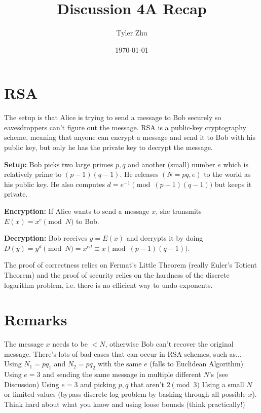\documentclass[11 pt]{scrartcl}
\newcommand{\hwtitle}{Discussion 4A Recap}
\begin{document}
 
\title{\Large \hwtitle{}}
\author{\large Tyler Zhu}
\date{\large\today}

\maketitle 

\section{RSA}
The setup is that Alice is trying to send a message to Bob securely so eavesdroppers can't figure out the message. RSA is a public-key cryptography scheme, meaning that anyone can encrypt a message and send it to Bob with his public key, but only he has the private key to decrypt the message.

\textbf{Setup:} Bob picks two large primes $p,q$ and another (small) number $e$ which is relatively prime to $(p-1)(q-1)$. He releases $(N=pq, e)$ to the world as his public key. He also computes $d = e^{-1} \pmod{(p-1)(q-1)}$ but keeps it private.

\textbf{Encryption:} If Alice wants to send a message $x$, she transmits $E(x) = x^e \pmod{N}$ to Bob.

\textbf{Decryption:} Bob receives $y = E(x)$ and decrypts it by doing $D(y) = y^d \pmod{N} = x^{ed} \equiv x \pmod{(p-1)(q-1)}$.  

The proof of correctness relies on Fermat's Little Theorem (really Euler's Totient Theorem) and the proof of security relies on the hardness of the discrete logarithm problem, i.e. there is no efficient way to undo exponents.

\section{Remarks}
\itemnum
    \ii The message $x$ needs to be $<N$, otherwise Bob can't recover the original message. 
    \ii There's lots of bad cases that can occur in RSA schemes, such as... 
    \itemnum
        \ii Using $N_1 = pq_1$ and $N_2 = pq_2$ with the same $e$ (falls to Euclidean Algorithm)
        \ii Using $e = 3$ and sending the same message in multiple different $N$'s (see Discussion)
        \ii Using $e = 3$ and picking $p,q$ that aren't $2 \pmod{3}$
        \ii Using a small $N$ or limited values (bypass discrete log problem by bashing through all possible $x$). 
    \itemend
    \ii Think hard about what you know and using loose bounds (think practically!) 
\itemend
\end{document}

